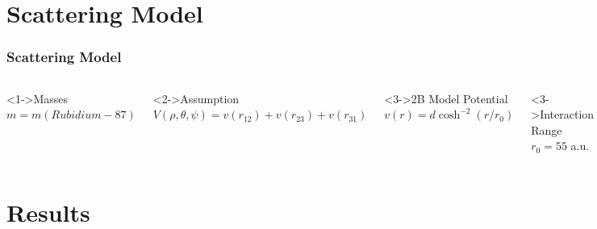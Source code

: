 \documentclass[hideothersubsections]{beamer}
\begin{document}
\section{Scattering Model}
\begin{frame}
\frametitle{Scattering Model}
\begin{columns}
\begin{block}<1->{Masses} 
	$m = m(Rubidium-87)$
\end{block}
\begin{block}<2->{Assumption}
	$V(\rho,\theta,\psi) = v(r_{12}) + v(r_{23}) + v(r_{31})$
\end{block}
\begin{block}<3->{2B Model Potential}
	$v(r) = d\cosh^{-2}{(r/r_0)}$
\end{block}
\begin{block}<3->{Interaction Range}
	$r_0 = 55$ a.u.
\end{block}
	\includegraphics[width=1.0\linewidth]{scattering_new.pdf}
\end{columns}
\end{frame}

\section{Results}
\end{document}
